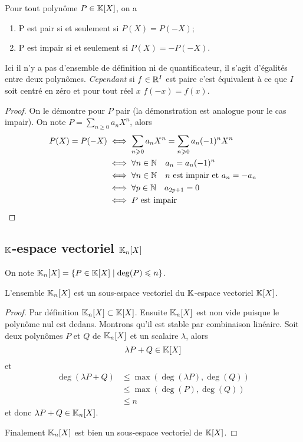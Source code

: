 \begin{prop}
  Pour tout polynôme \(P \in \mathbb{K}[X]\), on a
  \begin{enumerate}
  \item P est pair si et seulement si \(P(X)=P(-X)\);
  \item P est impair si et seulement si \(P(X)=-P(-X)\).
  \end{enumerate}
\end{prop}

\danger Ici il n'y a pas d'ensemble de définition ni de quantificateur, il s'agit d'égalités entre deux polynômes. \emph{Cependant} si \(f \in \mathbb{R}^I\) est paire c'est équivalent à ce que \(I\) soit centré en zéro et pour tout réel \(x\) \(f(-x)=f(x)\).

\begin{proof}
  On le démontre pour \(P\) pair (la démonstration est analogue pour le cas impair). On note \(P = \sum_{n\geqslant 0} a_n X^n\), alors
  \begin{align}
    P(X) = P(-X) &\iff \sum_{n \geqslant 0} a_n X^n = \sum_{n \geqslant 0} a_n (-1)^n X^n\\
    &\iff \forall n \in \mathbb{N} \quad a_n=a_n(-1)^n\\
    &\iff \forall n \in \mathbb{N} \quad n \text{~est impair et~} a_n=-a_n\\
    &\iff \forall p \in \mathbb{N} \quad a_{2p+1}=0\\
    &\iff P \text{~est impair}
  \end{align}
\end{proof}

\subsection{\(\mathbb{K}\)-espace vectoriel \(\mathbb{K}_n[X]\)}

On note \(\mathbb{K}_n[X]=\left\{P \in \mathbb{K}[X]\mathrel{}\middle|\mathrel{}\deg(P) \leqslant n\right\}\).

\begin{prop}
  L'ensemble \(\mathbb{K}_n[X]\) est un sous-espace vectoriel du \(\mathbb{K}\)-espace vectoriel \(\mathbb{K}[X]\).
\end{prop}
\begin{proof}
  Par définition \(\mathbb{K}_n[X] \subset \mathbb{K}[X]\). Ensuite \(\mathbb{K}_n[X]\) est non vide puisque le polynôme nul est dedans. Montrons qu'il est stable par combinaison linéaire. Soit deux polynômes \(P\) et \(Q\) de \(\mathbb{K}_n[X]\) et un scalaire \(\lambda\), alors
  \begin{equation}
    \lambda P +Q \in \mathbb{K}[X]
  \end{equation}
  et
  \begin{align}
    \deg(\lambda P+Q) &\leqslant \max(\deg(\lambda P),\deg(Q))\\
    &\leqslant \max(\deg(P),\deg(Q))\\
    &\leqslant n
  \end{align}
  et donc \(\lambda P +Q \in \mathbb{K}_n[X]\).

  Finalement \(\mathbb{K}_n[X]\) est bien un sous-espace vectoriel de \(\mathbb{K}[X]\). 
\end{proof}

